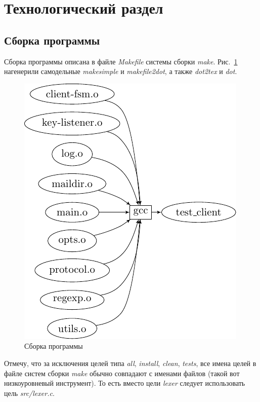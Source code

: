 \documentclass[a4paper,12pt]{report}
\begin{document}
% 
% 

\section{Технологический раздел}

\subsection{Сборка программы}

Сборка программы описана в файле \textit{Makefile} системы сборки \textit{make}. Рис.~\ref{fig:make} нагенерили самодельные \textit{makesimple} и \textit{makefile2dot}, а также \textit{dot2tex} и \textit{dot}.

\begin{figure}
\centering
\includegraphics[width=\textwidth]{include/Makefile_1_dot.pdf}
\caption{Сборка программы}
\label{fig:make}
\end{figure}

Отмечу, что за исключения целей типа \textit{all}, \textit{install}, \textit{clean}, \textit{tests}, все имена целей в файле систем сборки \textit{make} обычно совпадают с именами файлов (такой вот низкоуровневый инструмент). То есть вместо цели \textit{lexer} следует использовать цель \textit{src/lexer.c}.
\end{document}
